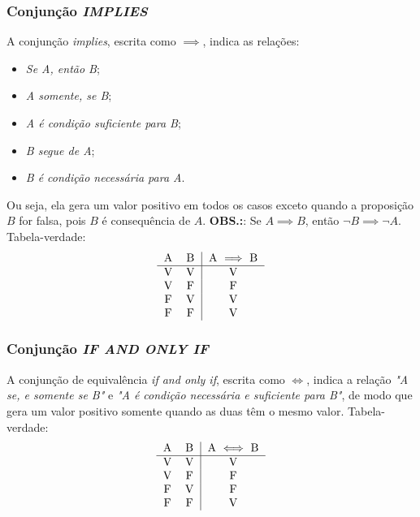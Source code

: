 \documentclass[13pt,letterpaper]{article}
\begin{document}
\subsubsection{Conjunção \emph{IMPLIES}}
A conjunção \emph{implies}, escrita como $\implies$, indica as relações:
\begin{itemize}
    \item \emph{Se A, então B};
    \item \emph{A somente, se B};
    \item \emph{A é condição suficiente para B};
    \item \emph{B segue de A};
    \item \emph{B é condição necessária para A}.
\end{itemize}
Ou seja, ela gera um valor positivo em todos os casos exceto quando a proposição $B$ for falsa, pois $B$ é consequência de $A$. 
\textbf{OBS.:}: Se $A \implies B$, então $\lnot B \implies \lnot A$.
Tabela-verdade:
\begin{align*}
    \begin{tabular}{cc|c}
         A & B & A $\implies$ B  \\
         \hline
         V & V & V \\
         V & F & F \\
         F & V & V \\
         F & F & V \\
    \end{tabular}
\end{align*}

\subsubsection{Conjunção \emph{IF AND ONLY IF}}
A conjunção de equivalência \emph{if and only if}, escrita como $\iff$, indica a relação \emph{"A se, e somente se B"} e \emph{"A é condição necessária e suficiente para B"}, de modo que gera um valor positivo somente quando as duas têm o mesmo valor.
Tabela-verdade:
\begin{align*}
    \begin{tabular}{cc|c}
         A & B & A $\iff$ B  \\
         \hline
         V & V & V \\
         V & F & F \\
         F & V & F \\
         F & F & V \\
    \end{tabular}
\end{align*}
\end{document}
